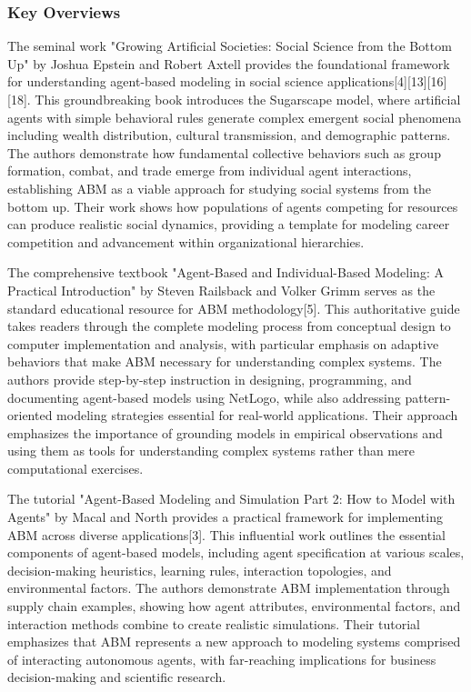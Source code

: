 \documentclass[main.tex]{subfiles}
\begin{document}
\subsubsection{Key Overviews}

The seminal work "Growing Artificial Societies: Social Science from the Bottom Up" by Joshua Epstein and Robert Axtell provides the foundational framework for understanding agent-based modeling in social science applications[4][13][16][18]. This groundbreaking book introduces the Sugarscape model, where artificial agents with simple behavioral rules generate complex emergent social phenomena including wealth distribution, cultural transmission, and demographic patterns. The authors demonstrate how fundamental collective behaviors such as group formation, combat, and trade emerge from individual agent interactions, establishing ABM as a viable approach for studying social systems from the bottom up. Their work shows how populations of agents competing for resources can produce realistic social dynamics, providing a template for modeling career competition and advancement within organizational hierarchies.

The comprehensive textbook "Agent-Based and Individual-Based Modeling: A Practical Introduction" by Steven Railsback and Volker Grimm serves as the standard educational resource for ABM methodology[5]. This authoritative guide takes readers through the complete modeling process from conceptual design to computer implementation and analysis, with particular emphasis on adaptive behaviors that make ABM necessary for understanding complex systems. The authors provide step-by-step instruction in designing, programming, and documenting agent-based models using NetLogo, while also addressing pattern-oriented modeling strategies essential for real-world applications. Their approach emphasizes the importance of grounding models in empirical observations and using them as tools for understanding complex systems rather than mere computational exercises.

The tutorial "Agent-Based Modeling and Simulation Part 2: How to Model with Agents" by Macal and North provides a practical framework for implementing ABM across diverse applications[3]. This influential work outlines the essential components of agent-based models, including agent specification at various scales, decision-making heuristics, learning rules, interaction topologies, and environmental factors. The authors demonstrate ABM implementation through supply chain examples, showing how agent attributes, environmental factors, and interaction methods combine to create realistic simulations. Their tutorial emphasizes that ABM represents a new approach to modeling systems comprised of interacting autonomous agents, with far-reaching implications for business decision-making and scientific research.
\end{document}
